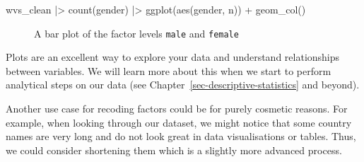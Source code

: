 \documentclass[
  letterpaper,
]{krantz}
\makeatletter
\newenvironment{Shaded}{\begin{snugshade}}{\end{snugshade}}
\newcommand{\FunctionTok}[1]{\textcolor[rgb]{0.28,0.35,0.67}{#1}}
\newcommand{\NormalTok}[1]{\textcolor[rgb]{0.00,0.23,0.31}{#1}}
\newcommand{\SpecialCharTok}[1]{\textcolor[rgb]{0.37,0.37,0.37}{#1}}
\newenvironment{kframe}{%
\medskip{}
\setlength{\fboxsep}{.8em}
 \def\at@end@of@kframe{}%
 \ifinner\ifhmode%
  \def\at@end@of@kframe{\end{minipage}}%
  \begin{minipage}{\columnwidth}%
 \fi\fi%
 \def\FrameCommand##1{\hskip\@totalleftmargin \hskip-\fboxsep
 \colorbox{shadecolor}{##1}\hskip-\fboxsep
     \hskip-\linewidth \hskip-\@totalleftmargin \hskip\columnwidth}%
 \MakeFramed {\advance\hsize-\width
   \@totalleftmargin\z@ \linewidth\hsize
   \@setminipage}}%
 {\par\unskip\endMakeFramed%
 \at@end@of@kframe}
\renewenvironment{Shaded}{\begin{kframe}}{\end{kframe}}
\makeatother
\begin{document}
\begin{Shaded}
\begin{Highlighting}[]
\NormalTok{wvs\_clean }\SpecialCharTok{|\textgreater{}}
  \FunctionTok{count}\NormalTok{(gender) }\SpecialCharTok{|\textgreater{}}
  \FunctionTok{ggplot}\NormalTok{(}\FunctionTok{aes}\NormalTok{(gender, n)) }\SpecialCharTok{+}
  \FunctionTok{geom\_col}\NormalTok{()}
\end{Highlighting}
\end{Shaded}

\begin{figure}[H]


\caption{\label{fig-gender-bar-plot}A bar plot of the factor levels
\texttt{male} and \texttt{female}}

\end{figure}%

Plots are an excellent way to explore your data and understand
relationships between variables. We will learn more about this when we
start to perform analytical steps on our data (see
Chapter~\ref{sec-descriptive-statistics} and beyond).

Another use case for recoding factors could be for purely cosmetic
reasons. For example, when looking through our dataset, we might notice
that some country names are very long and do not look great in data
visualisations or tables. Thus, we could consider shortening them which
is a slightly more advanced process.
\end{document}
